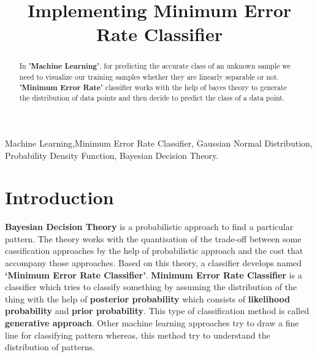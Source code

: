 \documentclass[conference]{IEEEtran}
\begin{document}
\title{Implementing Minimum Error Rate Classifier\\
}

\author{

}

\maketitle

\begin{abstract}
In \textbf{'Machine Learning'}, for predicting the accurate class of an unknown sample we need to visualize our training samples whether they are linearly separable or not. \textbf{'Minimum Error Rate'} classifier works with the help of bayes theory to generate the distribution of data points and then decide to predict the class of a data point.
\end{abstract}

\begin{IEEEkeywords}
Machine Learning,Minimum Error Rate Classifier, Gaussian Normal Distribution, Probability Density Function, Bayesian Decision Theory.
\end{IEEEkeywords}

\section{Introduction}
\textbf{Bayesian Decision Theory} is a probabilistic approach to find a particular pattern. The theory works with the quantisation of the trade-off between some cassification approaches by the help of probabilistic approach and the cost that accompany those approaches. Based on this theory, a classifier develops named \textbf{‘Minimum Error Rate Classifier'}. \textbf{Minimum Error Rate Classifier} is a classifier which tries to classify something by assuming the distribution of the thing with the help of \textbf{posterior probability} which consists of \textbf{likelihood probability} and \textbf{prior probability}. This type of classification method is called \textbf{generative approach}. Other machine learning approaches try to draw a fine line for classifying pattern whereas, this method try to understand the distribution of patterns.
\end{document}

